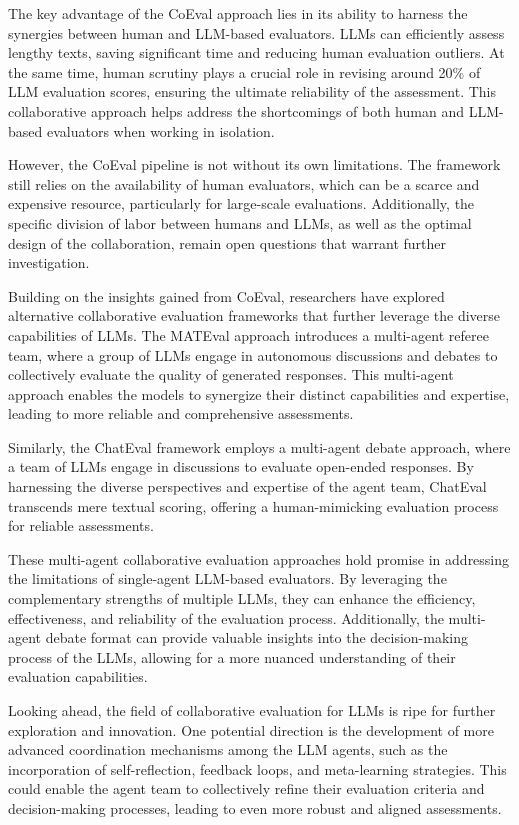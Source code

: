 \documentclass[11pt]{article}
\begin{document}
The key advantage of the CoEval approach lies in its ability to harness the synergies between human and LLM-based evaluators. LLMs can efficiently assess lengthy texts, saving significant time and reducing human evaluation outliers. At the same time, human scrutiny plays a crucial role in revising around 20\% of LLM evaluation scores, ensuring the ultimate reliability of the assessment. This collaborative approach helps address the shortcomings of both human and LLM-based evaluators when working in isolation.

However, the CoEval pipeline is not without its own limitations. The framework still relies on the availability of human evaluators, which can be a scarce and expensive resource, particularly for large-scale evaluations. Additionally, the specific division of labor between humans and LLMs, as well as the optimal design of the collaboration, remain open questions that warrant further investigation.

Building on the insights gained from CoEval, researchers have explored alternative collaborative evaluation frameworks that further leverage the diverse capabilities of LLMs. The MATEval approach \cite{ref131} introduces a multi-agent referee team, where a group of LLMs engage in autonomous discussions and debates to collectively evaluate the quality of generated responses. This multi-agent approach enables the models to synergize their distinct capabilities and expertise, leading to more reliable and comprehensive assessments.

Similarly, the ChatEval framework \cite{ref132} employs a multi-agent debate approach, where a team of LLMs engage in discussions to evaluate open-ended responses. By harnessing the diverse perspectives and expertise of the agent team, ChatEval transcends mere textual scoring, offering a human-mimicking evaluation process for reliable assessments.

These multi-agent collaborative evaluation approaches hold promise in addressing the limitations of single-agent LLM-based evaluators. By leveraging the complementary strengths of multiple LLMs, they can enhance the efficiency, effectiveness, and reliability of the evaluation process. Additionally, the multi-agent debate format can provide valuable insights into the decision-making process of the LLMs, allowing for a more nuanced understanding of their evaluation capabilities.

Looking ahead, the field of collaborative evaluation for LLMs is ripe for further exploration and innovation. One potential direction is the development of more advanced coordination mechanisms among the LLM agents, such as the incorporation of self-reflection, feedback loops, and meta-learning strategies. This could enable the agent team to collectively refine their evaluation criteria and decision-making processes, leading to even more robust and aligned assessments.
\end{document}
